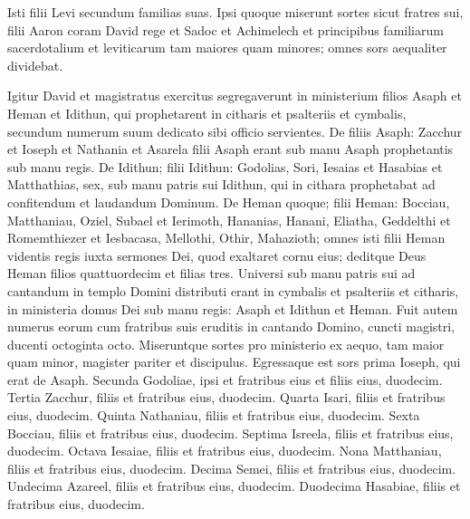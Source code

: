 \begin{biblechapter}
\begin{biblechapter}
\begin{biblechapter}
\begin{biblechapter}
\begin{biblechapter}
\begin{biblechapter}
\begin{biblechapter}
\begin{biblechapter}
\begin{biblechapter}
\begin{biblechapter}
\begin{biblechapter}
\begin{biblechapter}
\begin{biblechapter}
\begin{biblechapter}
\begin{biblechapter}
\begin{biblechapter}
\begin{biblechapter}
\begin{biblechapter}
\begin{biblechapter}
\begin{biblechapter}
\begin{biblechapter}
\begin{biblechapter}
\begin{biblechapter}
\begin{biblechapter}
 Isti filii Levi secundum familias suas. 
\verse Ipsi quoque miserunt sortes sicut fratres sui, filii Aaron coram David rege et Sadoc et Achimelech et principibus familiarum sacerdotalium et leviticarum tam maiores quam minores; omnes sors aequaliter dividebat.
 
\begin{biblechapter}
\verse Igitur David et magistratus exercitus segregaverunt in ministerium filios Asaph et Heman et Idithun, qui prophetarent in citharis et psalteriis et cymbalis, secundum numerum suum dedicato sibi officio servientes.
 \verse De filiis Asaph: Zacchur et Ioseph et Nathania et Asarela filii Asaph erant sub manu Asaph prophetantis sub manu regis. 
\verse De Idithun; filii Idithun: Godolias, Sori, Iesaias et Hasabias et Matthathias, sex, sub manu patris sui Idithun, qui in cithara prophetabat ad confitendum et laudandum Dominum. 
\verse De Heman quoque; filii Heman: Bocciau, Matthaniau, Oziel, Subael et Ierimoth, Hananias, Hanani, Eliatha, Geddelthi et Romemthiezer et Iesbacasa, Mellothi, Othir, Mahazioth; 
\verse omnes isti filii Heman videntis regis iuxta sermones Dei, quod exaltaret cornu eius; deditque Deus Heman filios quattuordecim et filias tres.
 \verse Universi sub manu patris sui ad cantandum in templo Domini distributi erant in cymbalis et psalteriis et citharis, in ministeria domus Dei sub manu regis: Asaph et Idithun et Heman. 
\verse Fuit autem numerus eorum cum fratribus suis eruditis in cantando Domino, cuncti magistri, ducenti octoginta octo.
 \verse Miseruntque sortes pro ministerio ex aequo, tam maior quam minor, magister pariter et discipulus. 
\verse Egressaque est sors prima Ioseph, qui erat de Asaph. Secunda Godoliae, ipsi et fratribus eius et filiis eius, duodecim. 
\verse Tertia Zacchur, filiis et fratribus eius, duodecim. 
\verse Quarta Isari, filiis et fratribus eius, duodecim. 
\verse Quinta Nathaniau, filiis et fratribus eius, duodecim. 
\verse Sexta Bocciau, filiis et fratribus eius, duodecim. 
\verse Septima Isreela, filiis et fratribus eius, duodecim. 
\verse Octava Iesaiae, filiis et fratribus eius, duodecim. 
\verse Nona Matthaniau, filiis et fratribus eius, duodecim. 
\verse Decima Semei, filiis et fratribus eius, duodecim. 
\verse Undecima Azareel, filiis et fratribus eius, duodecim. 
\verse Duodecima Hasabiae, filiis et fratribus eius, duodecim. 

\end{biblechapter}
\end{biblechapter}
\end{biblechapter}
\end{biblechapter}
\end{biblechapter}
\end{biblechapter}
\end{biblechapter}
\end{biblechapter}
\end{biblechapter}
\end{biblechapter}
\end{biblechapter}
\end{biblechapter}
\end{biblechapter}
\end{biblechapter}
\end{biblechapter}
\end{biblechapter}
\end{biblechapter}
\end{biblechapter}
\end{biblechapter}
\end{biblechapter}
\end{biblechapter}
\end{biblechapter}
\end{biblechapter}
\end{biblechapter}
\end{biblechapter}
